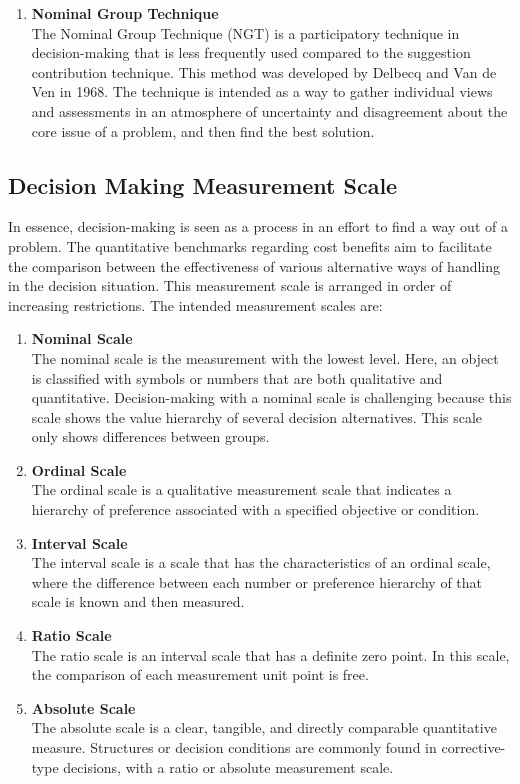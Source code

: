 \documentclass[12pt,titlepage]{article}
\begin{document}
\begin{enumerate}
\begin{enumerate}[label=\arabic*.]
        \item \textbf{Nominal Group Technique}\\
        The Nominal Group Technique (NGT) is a participatory technique in decision-making that is less frequently used compared to the suggestion contribution technique. This method was developed by Delbecq and Van de Ven in 1968. The technique is intended as a way to gather individual views and assessments in an atmosphere of uncertainty and disagreement about the core issue of a problem, and then find the best solution.
    \end{enumerate}
\end{enumerate}
\subsection{Decision Making Measurement Scale} \noindent
In essence, decision-making is seen as a process in an effort to find a way out of a problem. The quantitative benchmarks regarding cost benefits aim to facilitate the comparison between the effectiveness of various alternative ways of handling in the decision situation. This measurement scale is arranged in order of increasing restrictions. The intended measurement scales are:
\begin{enumerate}[label=\arabic*.]
    \item \textbf{Nominal Scale}\\
    The nominal scale is the measurement with the lowest level. Here, an object is classified with symbols or numbers that are both qualitative and quantitative. Decision-making with a nominal scale is challenging because this scale shows the value hierarchy of several decision alternatives. This scale only shows differences between groups.
    \item \textbf{Ordinal Scale}\\
    The ordinal scale is a qualitative measurement scale that indicates a hierarchy of preference associated with a specified objective or condition.
    \item \textbf{Interval Scale}\\
    The interval scale is a scale that has the characteristics of an ordinal scale, where the difference between each number or preference hierarchy of that scale is known and then measured.
    \item \textbf{Ratio Scale}\\
    The ratio scale is an interval scale that has a definite zero point. In this scale, the comparison of each measurement unit point is free.
    \item \textbf{Absolute Scale}\\
    The absolute scale is a clear, tangible, and directly comparable quantitative measure. Structures or decision conditions are commonly found in corrective-type decisions, with a ratio or absolute measurement scale.
\end{enumerate}
\end{document}

